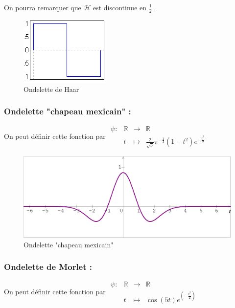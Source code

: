 \documentclass{article}
\begin{document}
On pourra remarquer que $\mathcal{H}$ est discontinue en $\frac{1}{2}$.

\begin{figure}[!h]
\centering
\includegraphics[scale=1.1]{haar.png}
\caption{Ondelette de Haar}
\label{haar}
\end{figure}

\subsubsection{Ondelette "chapeau mexicain" :}

On peut définir cette fonction par $\begin{array}{lrcl}
\psi : & \mathbb{R} & \longrightarrow & \mathbb{R} \\
    & t & \longmapsto & \frac{2}{\sqrt{3}}\pi^{-\frac{1}{4}}(1-t^2)e^{-\frac{t^2}{2}} \end{array}$
    
\begin{figure}[!h]
\centering
\includegraphics[scale=0.2]{chapeau_mexicain.png}
\caption{Ondelette "chapeau mexicain"}
\label{chapmex}
\end{figure}
    
\subsubsection{Ondelette de Morlet :}

On peut définir cette fonction par $\begin{array}{lrcl}
\psi : & \mathbb{R} & \longrightarrow & \mathbb{R} \\
    & t & \longmapsto & \cos(5t)e^{(-\frac{t^2}{2})} \end{array}$
    
\end{document}

